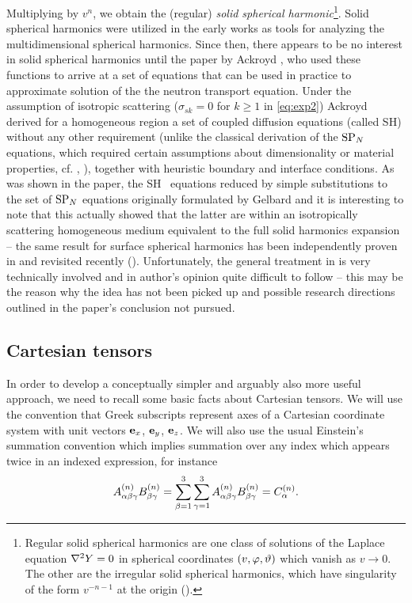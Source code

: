 Multiplying by $v^n$, we obtain the (regular) \textit{solid spherical harmonic}\footnote{Regular solid spherical
harmonics are one class of solutions of the Laplace equation $\lap Y = 0$ in spherical coordinates
$(v,\azimuthal,\polar)$ which vanish as $v\to 0$. The other are the irregular solid spherical harmonics, which have
singularity of the form $v^{-n-1}$ at the origin (\cite[Chap. VI]{Byerly}).}. Solid spherical harmonics were utilized
in the early works \cite{Davison, Rumyantsev} as tools for analyzing the multidimensional spherical harmonics. Since
then, there appears to be no interest in solid spherical harmonics until the paper by Ackroyd \cite{Ackroyd1}, who used
these functions to arrive at a set of equations that can be used in practice to approximate solution of the the neutron 
transport equation. Under the assumption of isotropic scattering ($\sigma_{sk} = 0$ for $k \geq 1$ in \eqref{eq:exp2}) 
Ackroyd derived for a homogeneous region a set of coupled diffusion equations (called SH\PN) without any other
requirement (unlike the classical derivation of the $\SPN$ equations, which required certain assumptions about 
dimensionality or material properties, cf. \cite{Larsen1}, \cite{Pomraning1}), together with heuristic boundary and
interface conditions. As was shown in the paper, the SH\PN~ equations reduced by simple substitutions to the set of 
$\SPN$ equations originally formulated by Gelbard and it is interesting to note that this actually showed that the 
latter are within an isotropically scattering homogeneous medium equivalent to the full solid harmonics expansion -- 
the same result for surface spherical harmonics has been independently proven in \cite{Coppa1} and revisited recently 
(\cite{Coppa2,McClarren1}). Unfortunately, the general treatment in \cite{Ackroyd1} is very technically involved and in 
author's opinion quite difficult to follow -- this may be the reason why the idea has not been picked up and possible 
research directions outlined in the paper's conclusion not pursued.

\subsection{Cartesian tensors}\label{sec:tensors}
In order to develop a conceptually simpler and arguably also more useful approach, we need to recall some basic facts
about Cartesian tensors. We will use the convention that Greek subscripts represent axes of a Cartesian coordinate
system with unit vectors $\be_x$, $\be_y$, $\be_z$. We will also use the usual Einstein's summation convention which
implies summation over any index which appears twice in an indexed expression, for instance $$
  \AAA{\alpha\beta\gamma}\BBB{\beta\gamma} =
  \suma[\beta]{1}{3}\suma[\gamma]{1}{3}\AAA{\alpha\beta\gamma}\BBB{\beta\gamma} = \CCC{\alpha}.
$$

